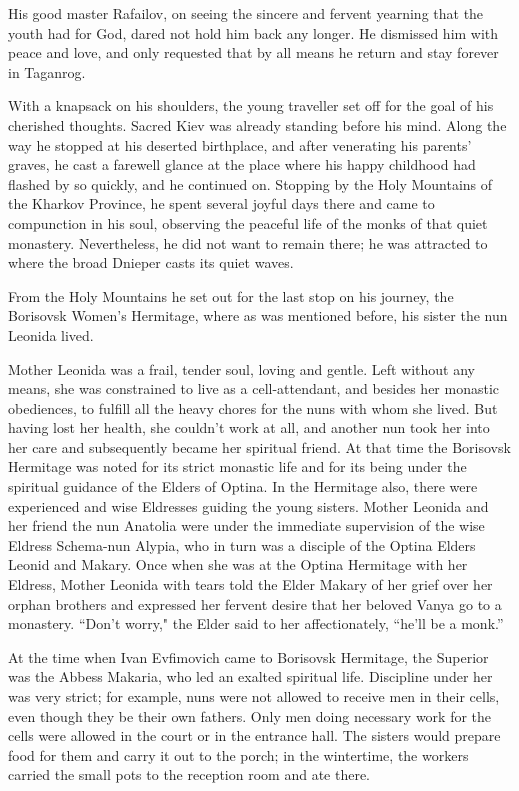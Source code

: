 His good master Rafailov, on seeing the sincere and fervent yearning that the youth had for God, dared not hold him back any longer. He dismissed him with peace and love, and only requested that by all means he return and stay forever in Taganrog.

With a knapsack on his shoulders, the young traveller set off for the goal of his cherished thoughts. Sacred Kiev was already standing before his mind. Along the way he stopped at his deserted birthplace, and after venerating his parents' graves, he cast a farewell glance at the place where his happy childhood had flashed by so quickly, and he continued on. Stopping by the Holy Mountains of the Kharkov Province, he spent several joyful days there and came to compunction in his soul, observing the peaceful life of the monks of that quiet monastery. Nevertheless, he did not want to remain there; he was attracted to where the broad Dnieper casts its quiet waves.

From the Holy Mountains he set out for the last stop on his journey, the Borisovsk Women's Hermitage, where as was mentioned before, his sister the nun Leonida lived.

Mother Leonida was a frail, tender soul, loving and gentle. Left without any means, she was constrained to live as a cell-attendant, and besides her monastic obediences, to fulfill all the heavy chores for the nuns with whom she lived. But having lost her health, she couldn't work at all, and another nun took her into her care and subsequently became her spiritual friend. At that time the Borisovsk Hermitage was noted for its strict monastic life and for its being under the spiritual guidance of the Elders of Optina. In the Hermitage also, there were experienced and wise Eldresses guiding the young sisters. Mother Leonida and her friend the nun Anatolia were under the immediate supervision of the wise Eldress Schema-nun Alypia, who in turn was a disciple of the Optina Elders Leonid and Makary. Once when she was at the Optina Hermitage with her Eldress, Mother Leonida with tears told the Elder Makary of her grief over her orphan brothers and expressed her fervent desire that her beloved Vanya go to a monastery. “Don't worry," the Elder said to her affectionately, “he'll be a monk.”

At the time when Ivan Evfimovich came to Borisovsk Hermitage, the Superior was the Abbess Makaria, who led an exalted spiritual life. Discipline under her was very strict; for example, nuns were not allowed to receive men in their cells, even though they be their own fathers. Only men doing necessary work for the cells were allowed in the court or in the entrance hall. The sisters would prepare food for them and carry it out to the porch; in the wintertime, the workers carried the small pots to the reception room and ate there.

